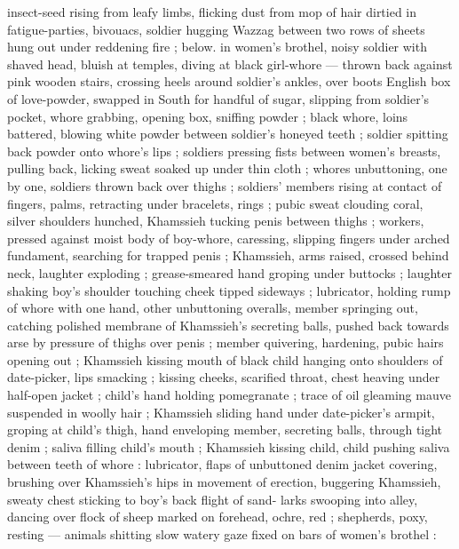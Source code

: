 insect-seed rising from leafy limbs, flicking dust from mop of hair dirtied in fatigue-parties,
bivouacs, soldier hugging Wazzag between two rows of %
sheets hung out under reddening fire ; below. in women's brothel, noisy soldier with shaved head,
bluish at temples, diving at black girl-whore --- thrown back against pink wooden stairs, crossing
heels around soldier's ankles, over boots {\dashcolon} English box of love-powder, swapped in South
for handful of sugar, slipping from soldier's pocket, whore grabbing, opening box, sniffing powder ;
black whore, loins battered, blowing white powder between soldier's honeyed teeth ; soldier spitting
back powder onto whore's lips ; soldiers pressing fists between women's breasts, pulling back,
licking sweat soaked up under thin cloth ; whores unbuttoning, one by one, soldiers thrown back over
thighs ; soldiers' members rising at contact of fingers, palms, retracting under bracelets, rings ;
pubic sweat clouding coral, silver {\semislash} shoulders hunched, Khamssieh tucking penis between
thighs ; workers, pressed against moist body of boy-whore, caressing, slipping fingers under arched
fundament, searching for trapped penis ; Khamssieh, arms raised, crossed behind neck, laughter
exploding ; grease-smeared hand groping under buttocks ; laughter shaking boy's shoulder touching
cheek tipped sideways{\td}  ; lubricator, holding rump of whore with
one hand, other unbuttoning overalls, member springing out, catching polished membrane of
Khamssieh's secreting balls, pushed back towards arse by pressure of thighs over penis ; member
quivering, hardening, pubic hairs opening out ; Khamssieh kissing mouth of black child hanging onto
shoulders of date-picker, lips smacking ; kissing cheeks, scarified throat, chest heaving under
half-open jacket ; child's hand holding pomegranate ; trace of oil gleaming mauve suspended in
woolly hair ; Khamssieh sliding hand under date-picker's armpit, groping at child's thigh, hand
enveloping member, secreting balls, through tight denim ; saliva filling child's mouth ; Khamssieh
kissing child, child pushing saliva between teeth of whore : lubricator, flaps of unbuttoned denim
jacket covering, brushing over Khamssieh's hips in movement of erection, buggering Khamssieh, sweaty
chest sticking to boy's back {\slashsemi} flight of sand-%
larks swooping into alley, dancing over flock of sheep marked on forehead, ochre, red ; shepherds,
poxy, resting --- animals shitting {\dashcom} slow watery gaze fixed on bars of women's brothel :
